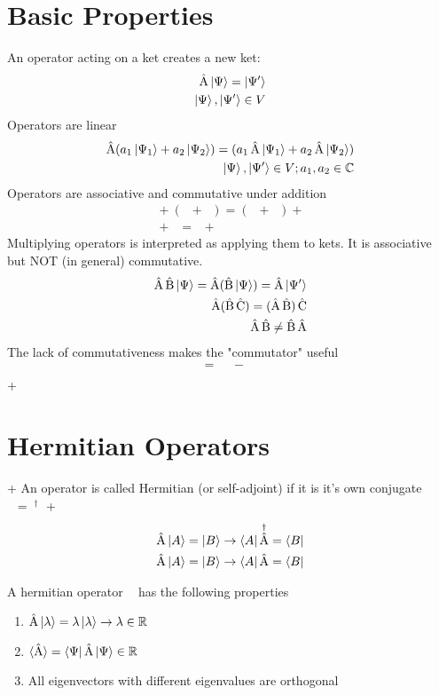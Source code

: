\documentclass[10pt,a4paper]{book}
\DeclareMathOperator {\opA} {\hat{A}}
\DeclareMathOperator {\opB} {\hat{B}}
\DeclareMathOperator {\opC} {\hat{C}}
\begin{document}
    \section{Basic Properties}
    An operator acting on a ket creates a new ket:
    \begin{align}
    \opA \ket{\Psi} = \ket{\Psi'} \\
    \ket{\Psi}, \ket{\Psi'} \in V
    \end{align}
    Operators are linear
    \begin{align}
    \opA (a_1\ket{\Psi_1} + a_2\ket{\Psi_2}) = (a_1\opA\ket{\Psi_1} + a_2\opA\ket{\Psi_2}) \\
    \ket{\Psi}, \ket{\Psi'} \in V; a_1, a_2 \in \mathbb{C}
    \end{align}
    Operators are associative and commutative under addition
    \begin{align}
    \opA + (\opB + \opC) = (\opA + \opB) + \opC \\
    \opA + \opB = \opB + \opA 
    \end{align}
    Multiplying operators is interpreted as applying them to kets. It is associative but NOT (in general) commutative.
    \begin{align}
    \opA\opB\ket{\Psi} = \opA(\opB\ket{\Psi}) = \opA\ket{\Psi'} \\
    \opA(\opB\opC) = (\opA\opB)\opC \\
    \opA\opB \ne \opB\opA
    \end{align}
    The lack of commutativeness makes the "commutator" useful
    \begin{align}
    [\opA, \opB] = \opA\opB - \opB\opA \\
    \end{align}
    +    \section{Hermitian Operators}
+    An operator is called Hermitian (or self-adjoint) if it is it's own conjugate $\opA = \opA^\dagger$
+    
    \begin{align}
    \opA\ket{A} = \ket{B} \rightarrow \bra{A}\opA^\dagger = \bra{B} \\
    \opA\ket{A} = \ket{B} \rightarrow \bra{A}\opA = \bra{B} \\
    \end{align}
    
    A hermitian operator $\opA$ has the following properties
    \begin{enumerate}
    \item $\opA\ket{\lambda} = \lambda \ket{\lambda} \rightarrow \lambda \in \mathbb{R}$
    \item $\braket{\opA} = \bra{\Psi}\opA\ket{\Psi} \in \mathbb{R}$
    \item All eigenvectors with different eigenvalues are orthogonal
    \end{enumerate}
\end{document}
